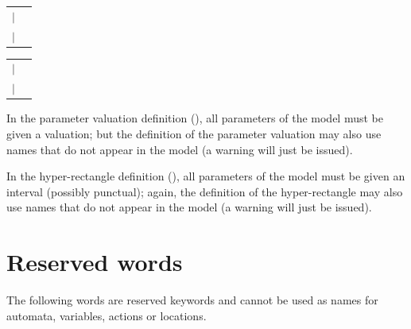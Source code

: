 \begin{tabular}{l l}
	$|$ & \styleIMI{, }  \\
	$|$ & \emptystring{} \\
\end{tabular}


\begin{tabular}{l l}
	$|$ & \styleIMI{;}   \\
	$|$ & \emptystring{} \\
\end{tabular}





\begin{remark}
	In the parameter valuation definition (), all parameters of the model must be given a valuation; but the definition of the parameter valuation may also use names that do not appear in the model (a warning will just be issued).
\end{remark}

\begin{remark}
	In the hyper-rectangle definition (), all parameters of the model must be given an interval (possibly punctual); again, the definition of the hyper-rectangle may also use names that do not appear in the model (a warning will just be issued).
\end{remark}





\section{Reserved words}

The following words are reserved keywords and cannot be used as names for automata, variables, actions or locations.

